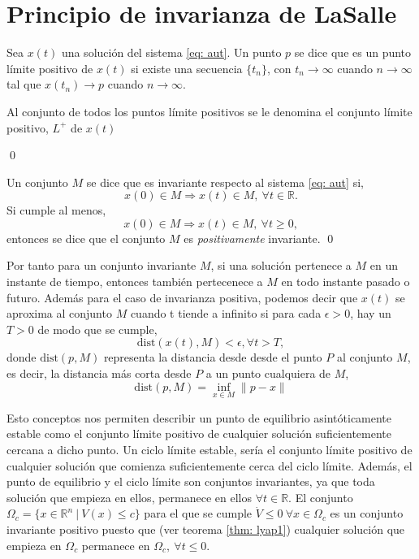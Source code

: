 \section{Principio de invarianza de LaSalle}

\begin{definition}
Sea $x(t)$ una solución del sistema \ref{eq: aut}. Un punto $p$ se dice que es un punto límite positivo de $x(t)$ si existe una secuencia $\{t_n\}$, con $t_n\to \infty$ cuando $n\to \infty$ tal que $x(t_n) \to p$ cuando $n \to \infty$.

Al conjunto de todos los puntos límite positivos se le denomina el conjunto límite positivo, $L^+$ de $x(t)$

\qed
\end{definition}

\begin{definition}
Un conjunto $M$ se dice que es invariante respecto al sistema \ref{eq: aut}  si,
\begin{equation*}
x(0) 	\in M \Rightarrow x(t) \in M,\ \forall t \in \mathbb{R}.
\end{equation*}
Si cumple al menos,
\begin{equation*}
x(0) 	\in M \Rightarrow x(t) \in M,\ \forall t \geq 0,
\end{equation*}
entonces se dice que el conjunto $M$ es \emph{positivamente} invariante.
\qed
\end{definition}

Por tanto para un conjunto invariante $M$, si una solución pertenece a $M$ en un instante de tiempo, entonces también pertecenece a $M$ en todo instante pasado o futuro. Además para el caso de invarianza positiva, podemos decir que $x(t)$ se aproxima al conjunto $M$ cuando t tiende a infinito si para cada $\epsilon >0$,  hay un $T>0$ de modo que se cumple,
\begin{equation*}
\text{dist}(x(t),M)<\epsilon, \forall t>T,
\end{equation*} 
donde $\text{dist}(p,M)$ representa la distancia desde desde el punto $P$ al conjunto $M$, es decir, la distancia más corta desde $P$ a un punto cualquiera de $M$,
\begin{equation}
\text{dist}(p,M) = \inf_{x\in M}\|p-x\|
\end{equation} 

Esto conceptos nos permiten describir un punto de equilibrio asintóticamente estable como el conjunto límite positivo de cualquier solución suficientemente cercana a dicho punto. Un ciclo límite estable, sería el conjunto límite positivo de cualquier solución que comienza suficientemente cerca del ciclo límite. Además, el punto de equilibrio y el ciclo límite son conjuntos invariantes, ya que toda solución que empieza en ellos, permanece en ellos $\forall t \in \mathbb{R}$. El conjunto $\Omega_c =\{x \in \mathbb{R}^n\ |\ V(x)\leq c\}$ para el que se cumple $\dot V \leq 0\ \forall x \in \Omega_c$ es un conjunto invariante positivo puesto que (ver teorema \ref{thm: lyap1}) cualquier solución que empieza en $\Omega_c$ permanece en $\Omega_c, \ \forall t \leq 0$.

